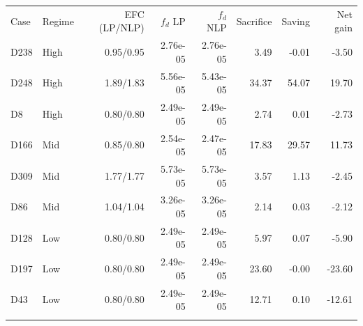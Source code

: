 \begin{tabular}{l l r r r r r r}
\hline\noalign{\smallskip}
Case & Regime & EFC (LP/NLP) & $f_d$ LP & $f_d$ NLP & Sacrifice & Saving & Net gain \\
\noalign{\smallskip}\hline\noalign{\smallskip}
D238 & High & 0.95/0.95 & 2.76e-05 & 2.76e-05 & 3.49 & -0.01 & -3.50 \\
D248 & High & 1.89/1.83 & 5.56e-05 & 5.43e-05 & 34.37 & 54.07 & 19.70 \\
D8 & High & 0.80/0.80 & 2.49e-05 & 2.49e-05 & 2.74 & 0.01 & -2.73 \\
D166 & Mid & 0.85/0.80 & 2.54e-05 & 2.47e-05 & 17.83 & 29.57 & 11.73 \\
D309 & Mid & 1.77/1.77 & 5.73e-05 & 5.73e-05 & 3.57 & 1.13 & -2.45 \\
D86 & Mid & 1.04/1.04 & 3.26e-05 & 3.26e-05 & 2.14 & 0.03 & -2.12 \\
D128 & Low & 0.80/0.80 & 2.49e-05 & 2.49e-05 & 5.97 & 0.07 & -5.90 \\
D197 & Low & 0.80/0.80 & 2.49e-05 & 2.49e-05 & 23.60 & -0.00 & -23.60 \\
D43 & Low & 0.80/0.80 & 2.49e-05 & 2.49e-05 & 12.71 & 0.10 & -12.61 \\
\noalign{\smallskip}\hline
\end{tabular}